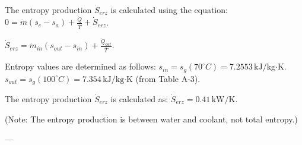 The entropy production \( \dot{S}_{erz} \) is calculated using the equation:  
\( 0 = \dot{m} (s_e - s_a) + \frac{\dot{Q}}{\bar{T}} + \dot{S}_{erz} \).  

\( \dot{S}_{erz} = \dot{m}_{in} (s_{out} - s_{in}) + \frac{\dot{Q}_{out}}{\bar{T}} \).  

Entropy values are determined as follows:  
\( s_{in} = s_g(70^\circ C) = 7.2553 \, \text{kJ/kg·K} \).  
\( s_{out} = s_g(100^\circ C) = 7.354 \, \text{kJ/kg·K} \) (from Table A-3).  

The entropy production \( \dot{S}_{erz} \) is calculated as:  
\( \dot{S}_{erz} = 0.41 \, \text{kW/K} \).  

(Note: The entropy production is between water and coolant, not total entropy.)  

---